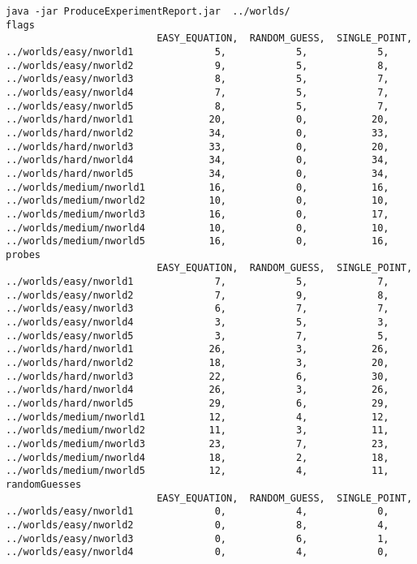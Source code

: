 \documentclass[british]{article}
\begin{document}
\begin{lstlisting}
java -jar ProduceExperimentReport.jar  ../worlds/
flags
                          EASY_EQUATION,  RANDOM_GUESS,  SINGLE_POINT,
../worlds/easy/nworld1              5,            5,            5,
../worlds/easy/nworld2              9,            5,            8,
../worlds/easy/nworld3              8,            5,            7,
../worlds/easy/nworld4              7,            5,            7,
../worlds/easy/nworld5              8,            5,            7,
../worlds/hard/nworld1             20,            0,           20,
../worlds/hard/nworld2             34,            0,           33,
../worlds/hard/nworld3             33,            0,           20,
../worlds/hard/nworld4             34,            0,           34,
../worlds/hard/nworld5             34,            0,           34,
../worlds/medium/nworld1           16,            0,           16,
../worlds/medium/nworld2           10,            0,           10,
../worlds/medium/nworld3           16,            0,           17,
../worlds/medium/nworld4           10,            0,           10,
../worlds/medium/nworld5           16,            0,           16,
probes
                          EASY_EQUATION,  RANDOM_GUESS,  SINGLE_POINT,
../worlds/easy/nworld1              7,            5,            7,
../worlds/easy/nworld2              7,            9,            8,
../worlds/easy/nworld3              6,            7,            7,
../worlds/easy/nworld4              3,            5,            3,
../worlds/easy/nworld5              3,            7,            5,
../worlds/hard/nworld1             26,            3,           26,
../worlds/hard/nworld2             18,            3,           20,
../worlds/hard/nworld3             22,            6,           30,
../worlds/hard/nworld4             26,            3,           26,
../worlds/hard/nworld5             29,            6,           29,
../worlds/medium/nworld1           12,            4,           12,
../worlds/medium/nworld2           11,            3,           11,
../worlds/medium/nworld3           23,            7,           23,
../worlds/medium/nworld4           18,            2,           18,
../worlds/medium/nworld5           12,            4,           11,
randomGuesses
                          EASY_EQUATION,  RANDOM_GUESS,  SINGLE_POINT,
../worlds/easy/nworld1              0,            4,            0,
../worlds/easy/nworld2              0,            8,            4,
../worlds/easy/nworld3              0,            6,            1,
../worlds/easy/nworld4              0,            4,            0,

\end{lstlisting}
\end{document}
